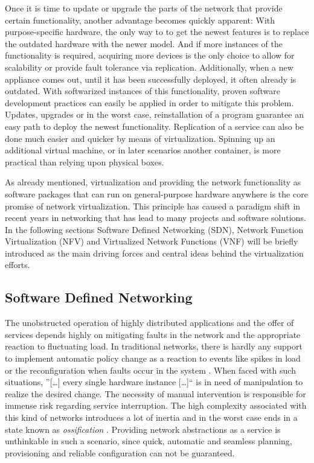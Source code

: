 Once it is time to update or upgrade the parts of the network that provide certain functionality, another advantage becomes quickly apparent: With purpose-specific hardware, the only way to to get the newest features is to replace the outdated hardware with the newer model. And if more instances of the functionality is required, acquiring more devices is the only choice to allow for scalability or provide fault tolerance via replication. Additionally, when a new appliance comes out, until it has been successfully deployed, it often already is outdated. With softwarized instances of this functionality, proven software development practices can easily be applied in order to mitigate this problem. Updates, upgrades or in the worst case, reinstallation of a program guarantee an easy path to deploy the newest functionality. Replication of a service can also be done much easier and quicker by means of virtualization. Spinning up an additional virtual machine, or in later scenarios another container, is more practical than relying upon physical boxes. 

As already mentioned, virtualization and providing the network functionality as software packages that can run on general-purpose hardware anywhere is the core promise of network virtualization. This principle has caused a paradigm shift in recent years in networking that has lead to many projects and software solutions. In the following sections Software Defined Networking (SDN), Network Function Virtualization (NFV) and Virtualized Network Functions (VNF) will be briefly introduced as the main driving forces and central ideas behind the virtualization efforts. 

\subsection{Software Defined Networking}
\label{sec:sdn}
The unobstructed operation of highly distributed applications and the offer of services depends highly on mitigating faults in the network and the appropriate reaction to fluctuating load. In traditional networks, there is hardly any support to implement automatic policy change as a reaction to events like spikes in load or the reconfiguration when faults occur in the system \cite{kreutz2015software}. When faced with such situations, ''[\dots] every single hardware instance [\dots]`` \cite{grossmann2013auto} is in need of manipulation to realize the desired change.  The necessity of manual intervention is responsible for immense risk regarding service interruption. The high complexity associated with this kind of networks introduces a lot of inertia and in the worst case ends in a state known as \textit{ossification} \cite{nunes2014survey}. Providing network abstractions as a service is unthinkable in such a scenario, since quick, automatic and seamless planning, provisioning and reliable configuration can not be guaranteed.

